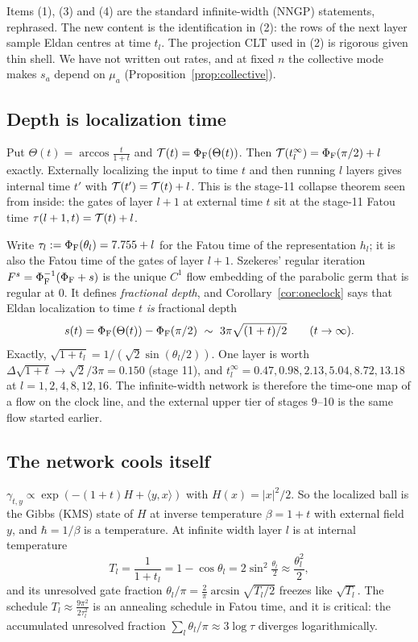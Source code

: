 \begin{remark}
Items (1), (3) and (4) are the standard infinite-width (NNGP) statements, rephrased. The new content is the identification in (2):
the rows of the next layer sample Eldan centres at time $t_l$. The projection CLT used in (2) is rigorous given thin shell. We have not
written out rates, and at fixed $n$ the collective mode makes $s_a$ depend on $\mu_a$ (Proposition~\ref{prop:collective}).
\end{remark}

\subsection{Depth is localization time}
\begin{corollary}\label{cor:oneclock}
Put $\Theta(t)=\arccos\frac t{1+t}$ and $\mathcal T(t)=\Phi_{\mathrm F}(\Theta(t))$. Then $\mathcal T(t_l^\infty)=\Phi_{\mathrm F}(\pi/2)+l$ exactly. Externally localizing the input to time
$t$ and then running $l$ layers gives internal time $t'$ with $\mathcal T(t')=\mathcal T(t)+l$. This is the stage-11 collapse theorem seen from inside:
the gates of layer $l+1$ at external time $t$ sit at the stage-11 Fatou time $\tau(l+1,t)=\mathcal T(t)+l$.
\end{corollary}
Write $\tau_l:=\Phi_{\mathrm F}(\theta_l)=7.755+l$ for the Fatou time of the representation $h_l$; it is also the Fatou time of the gates of layer $l+1$.
Szekeres' regular iteration $F^s=\Phi_{\mathrm F}^{-1}(\Phi_{\mathrm F}+s)$ is the unique $C^1$ flow embedding of the parabolic germ that is regular at $0$. It
defines \emph{fractional depth}, and Corollary~\ref{cor:oneclock} says that Eldan localization to time $t$ \emph{is} fractional depth
\[
s(t)=\Fa(\Theta(t))-\Fa(\pi/2)\ \sim\ 3\pi\sqrt{(1+t)/2}\qquad(t\to\infty).
\]
Exactly, $\sqrt{1+t_l}=1/(\sqrt2\sin(\theta_l/2))$. One layer is worth $\Delta\sqrt{1+t}\to\sqrt2/3\pi=0.150$ (stage 11), and
$t_l^\infty=0.47,0.98,2.13,5.04,8.72,13.18$ at $l=1,2,4,8,12,16$. The infinite-width network is therefore the time-one map of a flow
on the clock line, and the external upper tier of stages 9--10 is the same flow started earlier.

\subsection{The network cools itself}
\begin{proposition}\label{prop:cooling}
$\gamma_{t,y}\propto\exp(-(1+t)H+\langle y,x\rangle)$ with $H(x)=|x|^2/2$. So the localized ball is the Gibbs (KMS) state of $H$ at inverse
temperature $\beta=1+t$ with external field $y$, and $\hbar=1/\beta$ is a temperature. At infinite width layer $l$ is at internal
temperature
\[
T_l=\frac1{1+t_l}=1-\cos\theta_l=2\sin^2\tfrac{\theta_l}2\approx\frac{\theta_l^2}2,
\]
and its unresolved gate fraction $\theta_l/\pi=\frac2\pi\arcsin\sqrt{T_l/2}$ freezes like $\sqrt{T_l}$. The schedule $T_l\approx\frac{9\pi^2}{2\tau_l^2}$ is an
annealing schedule in Fatou time, and it is critical: the accumulated unresolved fraction $\sum_l\theta_l/\pi\approx3\log\tau$ diverges
logarithmically.
\end{proposition}

